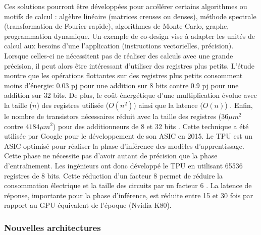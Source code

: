         Ces solutions pourront être développées pour accélérer certains algorithmes ou motifs de calcul \cite{asanovic2006landscape}: algèbre linéaire (matrices creuses ou denses), méthode spectrale (transformation de Fourier rapide), algorithmes de Monte-Carlo, graphe, programmation dynamique. Un exemple de co-design vise à adapter les unités de calcul aux besoins d'une l'application (instructions vectorielles, précision). Lorsque celles-ci ne nécessitent pas de réaliser des calculs avec une grande précision, il peut alors être intéressant d’utiliser des registres plus petits. L’étude \cite{Horowitz2014} montre que les opérations flottantes sur des registres plus petits consomment moins d’énergie: 0.03 pj pour une addition sur 8 bits contre 0.9 pj pour une addition sur 32 bits. De plus, le coût énergétique d’une multiplication évolue avec la taille ($n$) des registres utilisée ($O(n^2)$) ainsi que la latence ($O(n)$) \cite{Sze2017}. Enfin, le nombre de transistors nécessaires réduit avec la taille des registres ($36 \mu m^2$ contre $4184 \mu m^2$) pour des additionneurs de 8 et 32 bits \cite{Horowitz2014}. Cette technique a été utilisée par Google pour le développement de son ASIC en 2015. Le TPU est un ASIC optimisé pour réaliser la phase d'inférence des modèles d'apprentissage. Cette phase ne nécessite pas d'avoir autant de précision que la phase d'entraînement. Les ingénieurs ont donc développé le TPU en utilisant 65536 registres de 8 bits. Cette réduction d'un facteur 8 permet de réduire la consommation électrique et la taille des circuits par un facteur 6 \cite{Jouppi2017}. La latence de réponse, importante pour la phase d'inférence, est réduite entre 15 et 30 fois par rapport au GPU équivalent de l'époque (Nvidia K80).
            
          
            
    
        
    \subsubsection{Nouvelles architectures}\label{sec:new_soc}
    
